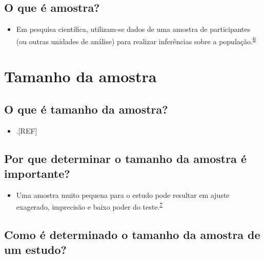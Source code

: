 \documentclass[
  a4paper,
]{book}
\providecommand{\tightlist}{%
  \setlength{\itemsep}{0pt}\setlength{\parskip}{0pt}}
\begin{document}
\hypertarget{o-que-uxe9-amostra}{%
\subsection{O que é amostra?}\label{o-que-uxe9-amostra}}

\begin{itemize}
\tightlist
\item
  Em pesquisa científica, utilizam-se dados de uma amostra de participantes (ou outras unidades de análise) para realizar inferências sobre a população.\textsuperscript{\protect\hyperlink{ref-Bland2015}{6}}
\end{itemize}

\hypertarget{tamanho-da-amostra}{%
\section{Tamanho da amostra}\label{tamanho-da-amostra}}

\hypertarget{o-que-uxe9-tamanho-da-amostra}{%
\subsection{O que é tamanho da amostra?}\label{o-que-uxe9-tamanho-da-amostra}}

\begin{itemize}
\tightlist
\item
  .{[}REF{]}
\end{itemize}

\hypertarget{por-que-determinar-o-tamanho-da-amostra-uxe9-importante}{%
\subsection{Por que determinar o tamanho da amostra é importante?}\label{por-que-determinar-o-tamanho-da-amostra-uxe9-importante}}

\begin{itemize}
\tightlist
\item
  Uma amostra muito pequena para o estudo pode resultar em ajuste exagerado, imprecisão e baixo poder do teste.\textsuperscript{\protect\hyperlink{ref-van2022}{7}}
\end{itemize}

\hypertarget{como-uxe9-determinado-o-tamanho-da-amostra-de-um-estudo}{%
\subsection{Como é determinado o tamanho da amostra de um estudo?}\label{como-uxe9-determinado-o-tamanho-da-amostra-de-um-estudo}}
\end{document}
